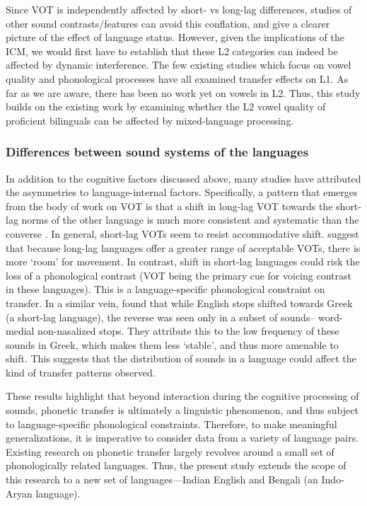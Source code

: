 \documentclass[charis,linguex]{glossa}
\begin{document}
Since VOT is independently affected by short- vs long-lag differences, studies of other sound contrasts/features can avoid this conflation, and give a clearer picture of the effect of language status. However, given the implications of the ICM, we would first have to establish that these L2 categories can indeed be affected by dynamic interference. The few existing studies which focus on vowel quality \citep{simonet2014phonetic,muldner2019phonetics,elias2017effects} and phonological processes \citep{simonet2020increased,schwartz2015language} have all examined transfer effects on L1. As far as we are aware, there has been no work yet on vowels in L2. Thus, this study builds on the existing work by examining whether the L2 vowel quality of proficient bilinguals can be affected by mixed-language processing.

\subsubsection{Differences between sound systems of the languages} \label{sound systems} In addition to the cognitive factors discussed above, many studies have attributed the asymmetries to language-internal factors. Specifically, a pattern that emerges from the body of work on VOT is that a shift in long-lag VOT towards the short-lag norms of the other language is much more consistent and systematic than the converse \cite{tobin2017phonetic, olson2016role,bullock2009trying,antoniou2011inter,chang2012rapid}. In general, short-lag VOTs seem to resist accommodative shift. \cite{bullock2009trying} suggest that because long-lag languages offer a greater range of acceptable VOTs, there is more `room' for movement. In contrast, shift in short-lag languages could risk the loss of a phonological contrast (VOT being the primary cue for voicing contrast in these languages).  This is a language-specific phonological constraint on transfer.
In a similar vein, \cite{antoniou2011inter} found that while English stops shifted towards Greek (a short-lag language), the reverse was seen only in a subset of sounds-- word-medial non-nasalized stops. They attribute this to the low frequency of these sounds in Greek, which makes them less `stable', and thus more amenable to shift. This suggests that the distribution of sounds in a language could affect the kind of transfer patterns observed.

These results highlight that beyond interaction during the cognitive processing of sounds, phonetic transfer is ultimately a linguistic phenomenon, and thus subject to language-specific phonological constraints. Therefore, to make meaningful generalizations, it is imperative to consider data from a variety of language pairs. Existing research on phonetic transfer largely revolves around a small set of phonologically related languages. Thus, the present study extends the scope of this research to a new set of languages---Indian English and Bengali (an Indo-Aryan language).
\end{document}
